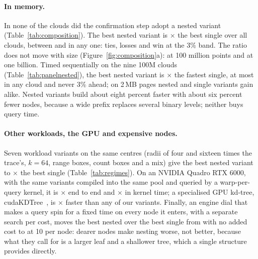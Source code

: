 \paragraph{In memory.} In none of the \nCells{} clouds did the confirmation step adopt a nested variant (Table~\ref{tab:composition}). The best nested variant is \nestedSingleAll$\times$ the best single over all clouds, between \nestedSingleLo{} and \nestedSingleHi{} in any one: \nestedTiesAll{} ties, \nestedLossesAll{} losses and \nestedWinsAll{} win at the 3\% band. The ratio does not move with size (Figure~\ref{fig:composition}a): \nestedSingleHundredM{} at 100 million points and \nestedSingleOneB{} at one billion. Timed sequentially on the nine 100M clouds (Table~\ref{tab:panelnested}), the best nested variant is \panelNestedSingleBase$\times$ the fastest single, at most \panelNestedSingleBaseMax{} in any cloud and never 3\% ahead; on 2\,MB pages nested and single variants gain alike. Nested variants build about eight percent faster with about six percent fewer nodes, because a wide prefix replaces several binary levels; neither buys query time.

\begin{table}[t]
\centering\footnotesize
\caption{Nested variants in the headline panel at 100M points, sequential protocol, geometric mean (range, clouds). The out-of-core winners are the nested variants adopted with the hierarchy paged (below), timed in memory.}
\label{tab:panelnested}

\end{table}

\paragraph{Other workloads, the GPU and expensive nodes.} Seven workload variants on the same centres (radii of four and sixteen times the trace's, $k = 64$, range boxes, count boxes and a mix) give the best nested variant \workloadNestedSingleMin{} to \workloadNestedSingleMax$\times$ the best single (Table~\ref{tab:regimes}). On an NVIDIA Quadro RTX 6000, with the same variants compiled into the same pool and queried by a warp-per-query kernel, it is \gpuNestedSingleTotal$\times$ end to end and \gpuNestedSingleKernel$\times$ in kernel time; a specialised GPU kd-tree, cudaKDTree~\cite{wald2022cudakdtree}, is \oursOverCudaKdTree$\times$ faster than any of our variants. Finally, an engine dial that makes a query spin for a fixed time on every node it enters, with a separate search per cost, moves the best nested over the best single from \nodeCostNestedSingleZero{} with no added cost to \nodeCostNestedSingleTenUs{} at 10\us{} per node: dearer nodes make nesting worse, not better, because what they call for is a larger leaf and a shallower tree, which a single structure provides directly.


